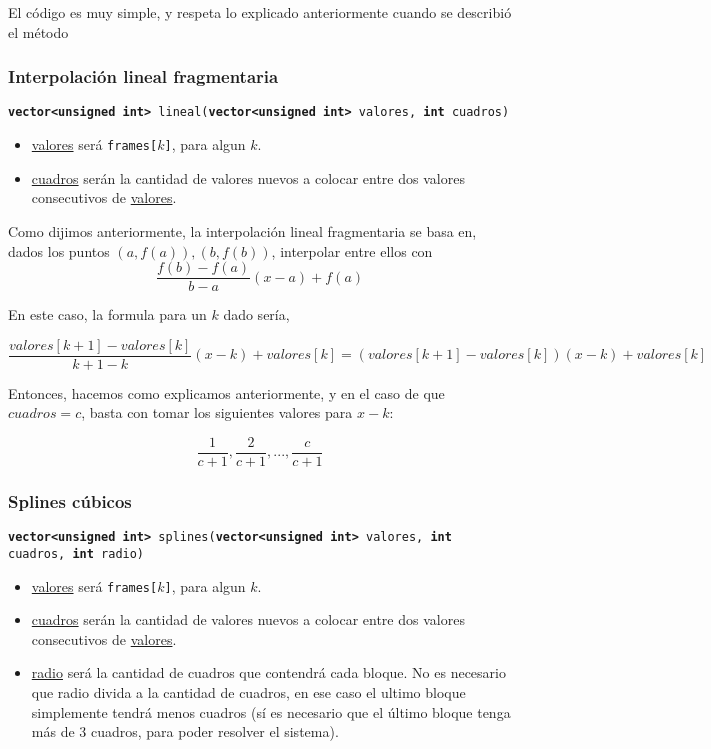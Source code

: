El código es muy simple, y respeta lo explicado anteriormente cuando se describió el método


\subsubsection{Interpolación lineal fragmentaria}
\texttt{\textbf{vector<unsigned int>} lineal(\textbf{vector<unsigned int>} valores, \textbf{int} cuadros)}

\begin{itemize}
    \item  \underline{valores} será \texttt{frames[$k$]}, para algun $k$.
    \item \underline{cuadros} serán la cantidad de valores nuevos a colocar entre dos valores consecutivos de \underline{valores}.
\end{itemize}


Como dijimos anteriormente, la interpolación lineal fragmentaria se basa en, dados los puntos $(a,f(a)), (b,f(b))$, interpolar entre ellos con \[\frac{f(b)-f(a)}{b-a} (x-a) + f(a)\]

En este caso, la formula para un $k$ dado sería,

\[\frac{valores[k+1] - valores[k]}{k+1 - k} (x - k) + valores[k] = (valores[k+1] - valores[k]) (x - k) + valores[k] \]

Entonces, hacemos como explicamos anteriormente, y en el caso de que $cuadros = c$, basta con tomar los siguientes valores para $x - k$:

\[\frac1{c+1}, \frac2{c+1}, ..., \frac{c}{c+1}\]

\subsubsection{Splines cúbicos}

\texttt{\textbf{vector<unsigned int>} splines(\textbf{vector<unsigned int>} valores, \textbf{int} cuadros, \textbf{int} radio)}

\begin{itemize}
    \item  \underline{valores} será \texttt{frames[$k$]}, para algun $k$.
    \item \underline{cuadros} serán la cantidad de valores nuevos a colocar entre dos valores consecutivos de \underline{valores}.
    \item \underline{radio} será la cantidad de cuadros que contendrá cada bloque. No es necesario que radio divida a la cantidad de cuadros, en ese caso el ultimo bloque simplemente tendrá menos cuadros (sí es necesario que el último bloque tenga más de 3 cuadros, para poder resolver el sistema).
\end{itemize}

